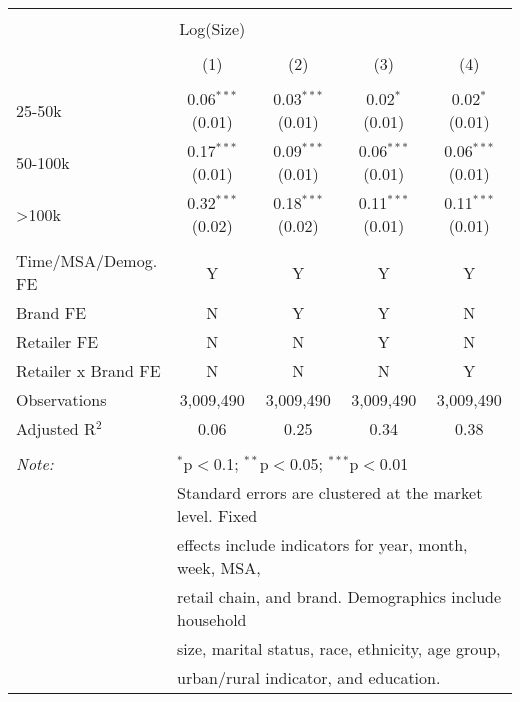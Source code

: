 
\begin{table}[!htbp] \centering 
  \caption{} 
  \label{tab:packageSizeFull7734} 
\begin{tabular}{@{\extracolsep{5pt}}lcccc} 
\\[-1.8ex]\hline 
\hline \\[-1.8ex] 
 & Log(Size) &  &  &  \\ 
\\[-1.8ex] & (1) & (2) & (3) & (4)\\ 
\hline \\[-1.8ex] 
 25-50k & 0.06$^{***}$ (0.01) & 0.03$^{***}$ (0.01) & 0.02$^{*}$ (0.01) & 0.02$^{*}$ (0.01) \\ 
  50-100k & 0.17$^{***}$ (0.01) & 0.09$^{***}$ (0.01) & 0.06$^{***}$ (0.01) & 0.06$^{***}$ (0.01) \\ 
  >100k & 0.32$^{***}$ (0.02) & 0.18$^{***}$ (0.02) & 0.11$^{***}$ (0.01) & 0.11$^{***}$ (0.01) \\ 
 \hline \\[-1.8ex] 
Time/MSA/Demog. FE & Y & Y & Y & Y \\ 
Brand FE & N & Y & Y & N \\ 
Retailer FE & N & N & Y & N \\ 
Retailer x Brand FE & N & N & N & Y \\ 
Observations & 3,009,490 & 3,009,490 & 3,009,490 & 3,009,490 \\ 
Adjusted R$^{2}$ & 0.06 & 0.25 & 0.34 & 0.38 \\ 
\hline 
\hline \\[-1.8ex] 
\textit{Note:}  & \multicolumn{4}{l}{$^{*}$p$<$0.1; $^{**}$p$<$0.05; $^{***}$p$<$0.01} \\ 
 & \multicolumn{4}{l}{Standard errors are clustered at the market level. Fixed } \\ 
 & \multicolumn{4}{l}{effects include indicators for year, month, week, MSA, } \\ 
 & \multicolumn{4}{l}{retail chain, and brand. Demographics include household } \\ 
 & \multicolumn{4}{l}{size, marital status, race, ethnicity, age group, } \\ 
 & \multicolumn{4}{l}{urban/rural indicator, and education.} \\ 
\end{tabular} 
\end{table} 
